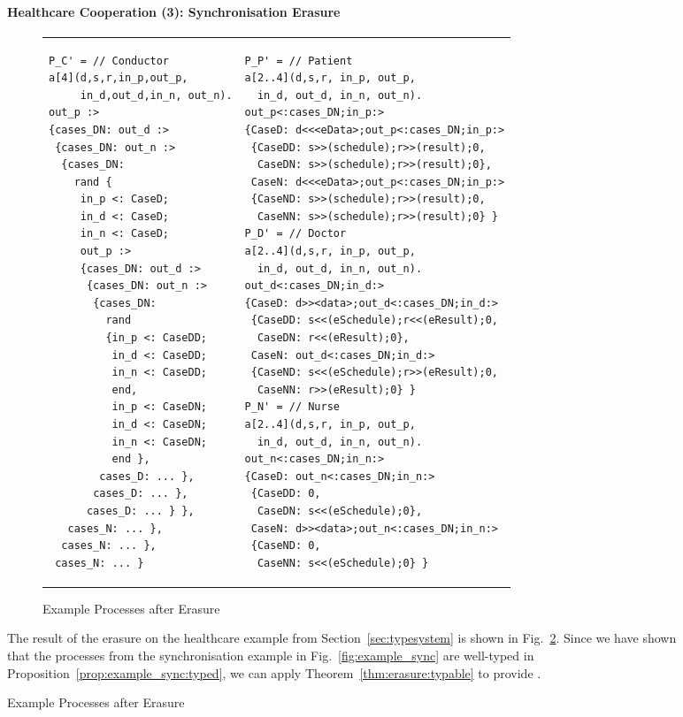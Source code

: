 \begin{figure}[t]
\paragraph{Healthcare Cooperation (3): Synchronisation Erasure} \begin{figure}[t] \scriptsize
\vspace*{-4mm}
\begin{tabular}{p{9cm}p{7cm}}
\begin{lstlisting}
P_C' = // Conductor
a[4](d,s,r,in_p,out_p,
     in_d,out_d,in_n, out_n).
out_p :>
{cases_DN: out_d :>
 {cases_DN: out_n :>
  {cases_DN:
    rand {
     in_p <: CaseD;
     in_d <: CaseD;
     in_n <: CaseD;
     out_p :>
     {cases_DN: out_d :>
      {cases_DN: out_n :>
       {cases_DN:
         rand
         {in_p <: CaseDD;
          in_d <: CaseDD;
          in_n <: CaseDD;
          end,
          in_p <: CaseDN;
          in_d <: CaseDN;
          in_n <: CaseDN;
          end },
        cases_D: ... },
       cases_D: ... },
      cases_D: ... } },
   cases_N: ... },
  cases_N: ... },
 cases_N: ... }
\end{lstlisting}
&
\begin{lstlisting}
P_P' = // Patient
a[2..4](d,s,r, in_p, out_p,
  in_d, out_d, in_n, out_n).
out_p<:cases_DN;in_p:>
{CaseD: d<<<eData>;out_p<:cases_DN;in_p:>
 {CaseDD: s>>(schedule);r>>(result);0,
  CaseDN: s>>(schedule);r>>(result);0},
 CaseN: d<<<eData>;out_p<:cases_DN;in_p:>
 {CaseND: s>>(schedule);r>>(result);0,
  CaseNN: s>>(schedule);r>>(result);0} }
P_D' = // Doctor
a[2..4](d,s,r, in_p, out_p,
  in_d, out_d, in_n, out_n).
out_d<:cases_DN;in_d:>
{CaseD: d>><data>;out_d<:cases_DN;in_d:>
 {CaseDD: s<<(eSchedule);r<<(eResult);0,
  CaseDN: r<<(eResult);0},
 CaseN: out_d<:cases_DN;in_d:>
 {CaseND: s<<(eSchedule);r>>(eResult);0,
  CaseNN: r>>(eResult);0} }
P_N' = // Nurse
a[2..4](d,s,r, in_p, out_p,
  in_d, out_d, in_n, out_n).
out_n<:cases_DN;in_n:>
{CaseD: out_n<:cases_DN;in_n:>
 {CaseDD: 0,
  CaseDN: s<<(eSchedule);0},
 CaseN: d>><data>;out_n<:cases_DN;in_n:>
 {CaseND: 0,
  CaseNN: s<<(eSchedule);0} }
\end{lstlisting}
\end{tabular}
\vspace*{-5mm}
\caption{Example Processes after Erasure}
\label{fig:example_erasure}
\end{figure} The result of the erasure on the healthcare example from
Section~\ref{sec:typesystem} is shown in Fig.~\ref{fig:example_erasure}.
Since we have shown that the processes from the synchronisation example in
Fig.~\ref{fig:example_sync} are well-typed in
Proposition~\ref{prop:example_sync:typed}, we can apply
Theorem~\ref{thm:erasure:typable} to 
provide . 


\end{figure}
